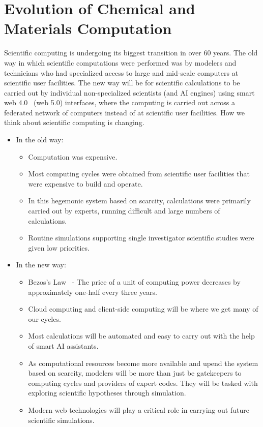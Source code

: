 \documentclass[runningheads,a4paper]{llncs}
\begin{document}
\section{Evolution of Chemical and Materials Computation}
\label{sec:Evolution}
Scientific computing is undergoing its biggest transition in over 60 years.  The old way in which scientific computations were performed was by modelers and technicians who had specialized access to large and mid-scale computers at scientific user facilities.  The new way will be for scientific calculations to be carried out by individual non-specialized scientists (and AI engines) using smart web 4.0~\cite{patel2013incremental} (web 5.0) interfaces, where the computing is carried out across a federated network of computers instead of at scientific user facilities. How we think about scientific computing is changing.  
\begin{itemize}
   \item  In the old way: 
   \begin{itemize}
      \item Computation was expensive. 
      \item Most computing cycles were obtained from scientific user facilities that were expensive to build and operate.
      \item In this hegemonic system based on scarcity, calculations were primarily carried out by experts, running difficult and large numbers of calculations.
      \item Routine simulations supporting single investigator scientific studies were given low priorities.
    \end{itemize}
   \item In the new way:
   \begin{itemize}
       \item Bezos’s Law~\cite{bezoslaw1,bezoslaw2,zia2017adaptive,weinman2014nuances,lin2015big} - The price of a unit of computing power decreases by approximately one-half every three years.
       \item Cloud computing and client-side computing  will be where we get many of our cycles.
       \item Most calculations will be automated and easy to carry out with the help of smart AI assistants.
       \item As computational resources become more available and upend 
       the system based on scarcity, modelers will be more than just be gatekeepers to computing cycles and providers of expert codes. They will be tasked with exploring scientific hypotheses through simulation.
       \item Modern web technologies will play a critical role in carrying out future scientific simulations. 
   \end{itemize}
\end{itemize}
\end{document}
